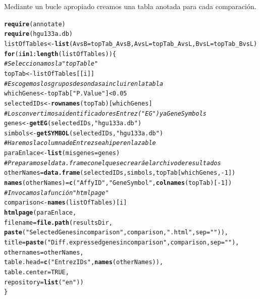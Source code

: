 \documentclass[a4paper]{article}\usepackage[]{graphicx}\usepackage[]{color}
\makeatletter
\newcommand{\hlnum}[1]{\textcolor[rgb]{0.686,0.059,0.569}{#1}}%
\newcommand{\hlstr}[1]{\textcolor[rgb]{0.192,0.494,0.8}{#1}}%
\newcommand{\hlcom}[1]{\textcolor[rgb]{0.678,0.584,0.686}{\textit{#1}}}%
\newcommand{\hlopt}[1]{\textcolor[rgb]{0,0,0}{#1}}%
\newcommand{\hlstd}[1]{\textcolor[rgb]{0.345,0.345,0.345}{#1}}%
\newcommand{\hlkwa}[1]{\textcolor[rgb]{0.161,0.373,0.58}{\textbf{#1}}}%
\newcommand{\hlkwb}[1]{\textcolor[rgb]{0.69,0.353,0.396}{#1}}%
\newcommand{\hlkwc}[1]{\textcolor[rgb]{0.333,0.667,0.333}{#1}}%
\newcommand{\hlkwd}[1]{\textcolor[rgb]{0.737,0.353,0.396}{\textbf{#1}}}%
\newenvironment{kframe}{%
 \def\at@end@of@kframe{}%
 \ifinner\ifhmode%
  \def\at@end@of@kframe{\end{minipage}}%
  \begin{minipage}{\columnwidth}%
 \fi\fi%
 \def\FrameCommand##1{\hskip\@totalleftmargin \hskip-\fboxsep
 \colorbox{shadecolor}{##1}\hskip-\fboxsep
     \hskip-\linewidth \hskip-\@totalleftmargin \hskip\columnwidth}%
 \MakeFramed {\advance\hsize-\width
   \@totalleftmargin\z@ \linewidth\hsize
   \@setminipage}}%
 {\par\unskip\endMakeFramed%
 \at@end@of@kframe}
\newenvironment{knitrout}{}{} %
\makeatother
\begin{document}
Mediante un bucle apropiado creamos una tabla anotada para cada comparación.

\begin{knitrout}
\color{fgcolor}\begin{kframe}
\begin{alltt}
\hlkwd{require}\hlstd{(annotate)}
\hlkwd{require}\hlstd{(hgu133a.db)}
\hlstd{listOfTables} \hlkwb{<-} \hlkwd{list}\hlstd{(}\hlkwc{AvsB} \hlstd{= topTab_AvsB,} \hlkwc{AvsL} \hlstd{= topTab_AvsL,} \hlkwc{BvsL} \hlstd{= topTab_BvsL)}
\hlkwa{for} \hlstd{(i} \hlkwa{in} \hlnum{1}\hlopt{:}\hlkwd{length}\hlstd{(listOfTables))\{}
  \hlcom{# Seleccionamos la "topTable"}
  \hlstd{topTab} \hlkwb{<-} \hlstd{listOfTables[[i]]}
  \hlcom{# Escogemos los grupos de sondas a incluir en la tabla}
  \hlstd{whichGenes}\hlkwb{<-}\hlstd{topTab[}\hlstr{"P.Value"}\hlstd{]}\hlopt{<}\hlnum{0.05}
  \hlstd{selectedIDs} \hlkwb{<-} \hlkwd{rownames}\hlstd{(topTab)[whichGenes]}
  \hlcom{# Los convertimos a identificadores Entrez ("EG") y a Gene Symbols}
  \hlstd{genes}\hlkwb{<-} \hlkwd{getEG}\hlstd{(selectedIDs,} \hlstr{"hgu133a.db"}\hlstd{)}
  \hlstd{simbols} \hlkwb{<-}\hlkwd{getSYMBOL}\hlstd{(selectedIDs,} \hlstr{"hgu133a.db"}\hlstd{)}
  \hlcom{# Haremos la columna de Entrez sea hiperenlazable}
  \hlstd{paraEnlace} \hlkwb{<-} \hlkwd{list} \hlstd{(}\hlkwc{misgenes}\hlstd{=genes)}
  \hlcom{# Preparamos el data.frame con el que se creará el archivo de resultados}
  \hlstd{otherNames} \hlkwb{=} \hlkwd{data.frame}\hlstd{(selectedIDs, simbols, topTab[whichGenes,}\hlopt{-}\hlnum{1}\hlstd{])}
  \hlkwd{names}\hlstd{(otherNames)} \hlkwb{=} \hlkwd{c}\hlstd{(}\hlstr{"Affy ID"}\hlstd{,} \hlstr{"Gene Symbol"}\hlstd{,} \hlkwd{colnames}\hlstd{(topTab)[}\hlopt{-}\hlnum{1}\hlstd{])}
  \hlcom{# Invocamos la función "htmlpage"}
  \hlstd{comparison} \hlkwb{<-} \hlkwd{names}\hlstd{(listOfTables)[i]}
  \hlkwd{htmlpage}\hlstd{(paraEnlace,}
           \hlkwc{filename} \hlstd{=}\hlkwd{file.path}\hlstd{(resultsDir,}
           \hlkwd{paste}\hlstd{(}\hlstr{"Selected Genes in comparison "}\hlstd{,comparison,}\hlstr{".html"}\hlstd{,} \hlkwc{sep}\hlstd{=}\hlstr{""}\hlstd{)) ,}
           \hlkwc{title} \hlstd{=} \hlkwd{paste}\hlstd{(}\hlstr{"Diff. expressed genes in comparison "}\hlstd{, comparison,} \hlkwc{sep}\hlstd{=}\hlstr{""}\hlstd{),}
           \hlkwc{othernames} \hlstd{= otherNames,}
           \hlkwc{table.head} \hlstd{=} \hlkwd{c}\hlstd{(}\hlstr{"Entrez IDs"}\hlstd{,} \hlkwd{names}\hlstd{(otherNames)),}
           \hlkwc{table.center} \hlstd{=} \hlnum{TRUE}\hlstd{,}
           \hlkwc{repository}\hlstd{=}\hlkwd{list}\hlstd{(}\hlstr{"en"}\hlstd{))}
\hlstd{\}}
\end{alltt}
\end{kframe}
\end{knitrout}
\end{document}
